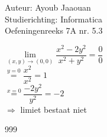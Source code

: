 \documentclass[a4paper]{article}
\begin{document}
\noindent \large Auteur: Ayoub Jaaouan \\
\noindent \large Studierichting: Informatica\\
\noindent \large Oefeningenreeks 7A nr. 5.3\\
\medskip

\normalsize


$ \lim\limits_{(x,y)\rightarrow (0,0)}\dfrac{x^2-2y^2}{x^2+y^2} = \dfrac{0}{0} $\\

$ \stackrel{y = 0}{=} \dfrac{x^2}{x^2} = 1 $\\

$ \stackrel{x = 0}{=} \dfrac{-2y^2}{y^2} = -2$ \\

$ \Rightarrow $ limiet bestaat niet \\


\begin{thebibliography}{999}
\end{thebibliography}
\end{document}

